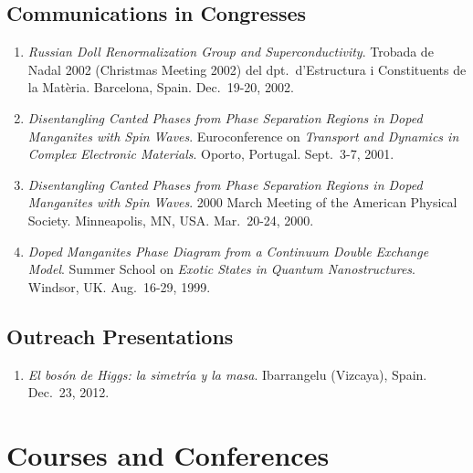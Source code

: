 \documentclass{article}
\begin{document}

\subsection*{Communications in Congresses}

\begin{enumerate}
\item
{\it Russian Doll Renormalization Group and Superconductivity}. 
Trobada de Nadal 2002 (Christmas Meeting 2002) del dpt.~d'Estructura 
i Constituents de la Mat\`eria. 
Barcelona, Spain.
Dec.~19-20, 2002.

\item
{\it Disentangling Canted Phases from Phase Separation Regions in Doped 
Manganites with Spin Waves}. 
Euroconference on {\it Transport and Dynamics in Complex Electronic Materials}.
Oporto, Portugal. 
Sept.~3-7, 2001. 

\item 
{\it Disentangling Canted Phases from Phase
Separation Regions in Doped Manganites with Spin Waves}.
2000 March Meeting of the American Physical Society. 
Minneapolis, MN, USA. 
Mar.~20-24, 2000.

\item 
{\it Doped Manganites Phase Diagram from a Continuum Double Exchange Model}. 
Summer School on {\it Exotic States in Quantum Nanostructures}. 
Windsor, UK. 
Aug.~16-29, 1999.
\end{enumerate}


\subsection*{Outreach Presentations}

\begin{enumerate}
\item
{\it El bos\'on de Higgs: la simetr\'{\i}a y la masa}. 
Ibarrangelu (Vizcaya), Spain.
Dec.~23, 2012. 
\end{enumerate}

\newpage


\section*{Courses and Conferences}
\end{document}
